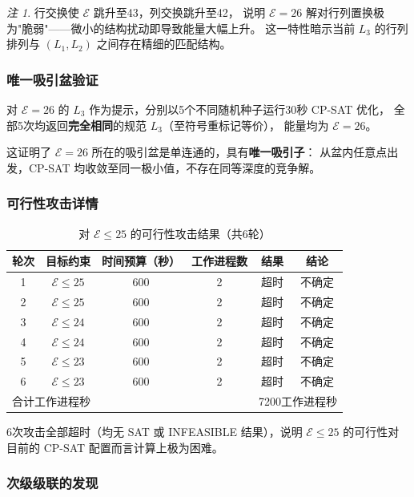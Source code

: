\documentclass[11pt,a4paper]{ctexart}
\theoremstyle{remark}
\newtheorem{remark}[theorem]{注}
\newcommand{\E}{\mathcal{E}}
\begin{document}
\begin{remark}
  行交换使 $\E$ 跳升至43，列交换跳升至42，
  说明 $\E = 26$ 解对行列置换极为"脆弱"——微小的结构扰动即导致能量大幅上升。
  这一特性暗示当前 $L_3$ 的行列排列与 $(L_1, L_2)$ 之间存在精细的匹配结构。
\end{remark}

\subsubsection{唯一吸引盆验证}

对 $\E = 26$ 的 $L_3$ 作为提示，分别以5个不同随机种子运行30秒 CP-SAT 优化，
全部5次均返回\textbf{完全相同}的规范 $L_3$（至符号重标记等价），
能量均为 $\E = 26$。

这证明了 $\E = 26$ 所在的吸引盆是单连通的，具有\textbf{唯一吸引子}：
从盆内任意点出发，CP-SAT 均收敛至同一极小值，不存在同等深度的竞争解。

\subsubsection{可行性攻击详情}

\begin{table}[htbp]
  \centering
  \caption{对 $\E \le 25$ 的可行性攻击结果（共6轮）}
  \label{tab:feasibility-attack}
  \begin{tabular}{cccccc}
    \toprule
    轮次 & 目标约束 & 时间预算（秒） & 工作进程数 & 结果 & 结论 \\
    \midrule
    1 & $\E \le 25$ & 600 & 2 & 超时 & 不确定 \\
    2 & $\E \le 25$ & 600 & 2 & 超时 & 不确定 \\
    3 & $\E \le 24$ & 600 & 2 & 超时 & 不确定 \\
    4 & $\E \le 24$ & 600 & 2 & 超时 & 不确定 \\
    5 & $\E \le 23$ & 600 & 2 & 超时 & 不确定 \\
    6 & $\E \le 23$ & 600 & 2 & 超时 & 不确定 \\
    \midrule
    \multicolumn{4}{l}{合计工作进程秒} & \multicolumn{2}{r}{7200工作进程秒} \\
    \bottomrule
  \end{tabular}
\end{table}

6次攻击全部超时（均无 SAT 或 INFEASIBLE 结果），说明
$\E \le 25$ 的可行性对目前的 CP-SAT 配置而言计算上极为困难。

\subsubsection{次级级联的发现}
\end{document}
